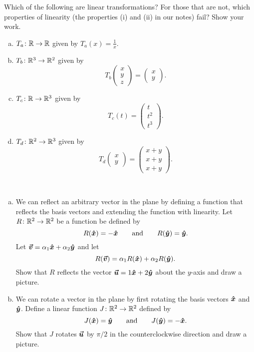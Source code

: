 \documentclass[12pt]{article} %
\begin{document}
\begin{problem}
Which of the following are linear transformations? For those that are not, which properties of linearity (the properties (i) and (ii) in our notes) fail? Show your work.
\begin{enumerate}[(a)]
    \item $T_a \colon \mathbb{R} \to \mathbb{R}$ given by $T_a(x)=\frac{1}{x}$.
    \item $T_b \colon \mathbb{R}^3 \to \mathbb{R}^2$ given by
    \[
    T_b \begin{pmatrix} x\\ y\\ z \end{pmatrix}
    = \begin{pmatrix} x\\ y \end{pmatrix}.
    \]
    \item $T_c \colon \mathbb{R} \to \mathbb{R}^3$ given by
    \[
    T_c(t)=\begin{pmatrix} t\\ t^2\\ t^3 \end{pmatrix}.
    \]
    \item $T_d \colon \mathbb{R}^2 \to \mathbb{R}^3$ given by
    \[
    T_d \begin{pmatrix} x\\ y \end{pmatrix}
    = \begin{pmatrix} x+y\\ x+y\\ x+y \end{pmatrix}.
    \]
\end{enumerate}
\end{problem}
\vspace*{0.5cm}

\begin{problem}~
\begin{enumerate}[(a)]
    \item We can reflect an arbitrary vector in the plane by defining a function that reflects the basis vectors and extending the function with linearity. Let $R\colon \mathbb{R}^2 \to \mathbb{R}^2$ be a function be defined by
    \[
    R(\boldsymbol{\hat{x}}) = -\boldsymbol{\hat{x}} \qquad \textrm{and} \qquad R(\boldsymbol{\hat{y}})=\boldsymbol{\hat{y}}.
    \]
    Let $\boldsymbol{\vec{v}} = \alpha_1 \boldsymbol{\hat{x}} + \alpha_2 \boldsymbol{\hat{y}}$ and let
    \[
    R(\boldsymbol{\vec{v}}) = \alpha_1 R(\boldsymbol{\hat{x}}) + \alpha_2 R(\boldsymbol{\hat{y}}).
    \]
    Show that $R$ reflects the vector $\boldsymbol{\vec{u}} = 1\boldsymbol{\hat{x}} + 2\boldsymbol{\hat{y}}$ about the $y$-axis and draw a picture.
    \item We can rotate a vector in the plane by first rotating the basis vectors $\boldsymbol{\hat{x}}$ and $\boldsymbol{\hat{y}}$. Define a linear function $J\colon \mathbb{R}^2 \to \mathbb{R}^2$ defined by
    \[
    J(\boldsymbol{\hat{x}})=\boldsymbol{\hat{y}} \qquad \textrm{and} \qquad J(\boldsymbol{\hat{y}})=-\boldsymbol{\hat{x}}.
    \]
    \noindent Show that $J$ rotates $\boldsymbol{\vec{u}}$ by $\pi/2$ in the counterclockwise direction and draw a picture.
\end{enumerate}
\end{problem}
\vspace*{0.5cm}
\end{document}
